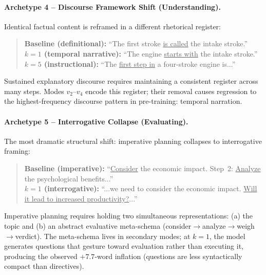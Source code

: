 \documentclass{article}
\begin{document}
\paragraph{Archetype 4 -- Discourse Framework Shift (Understanding).}
Identical factual content is reframed in a different rhetorical register:
\begin{quote}
\small
\textbf{Baseline (definitional):} ``The first stroke \underline{is called} the intake stroke.''\\
\textbf{$k\!=\!1$ (temporal narrative):} ``The engine \underline{starts with} the intake stroke.''\\
\textbf{$k\!=\!5$ (instructional):} ``The \underline{first step in} a four-stroke engine is...''
\end{quote}
Sustained explanatory discourse requires maintaining a consistent register across
many steps.  Modes $v_2$--$v_4$ encode this register; their removal causes
regression to the highest-frequency discourse pattern in pre-training:
temporal narration.

\paragraph{Archetype 5 -- Interrogative Collapse (Evaluating).}
The most dramatic structural shift: imperative planning collapses to interrogative framing:
\begin{quote}
\small
\textbf{Baseline (imperative):} ``\underline{Consider} the economic impact. Step~2: \underline{Analyze} the psychological benefits...''\\
\textbf{$k\!=\!1$ (interrogative):} ``...we need to consider the economic impact. \underline{Will it lead to increased productivity?}...''
\end{quote}
Imperative planning requires holding two simultaneous representations: (a) the topic
and (b) an abstract evaluative meta-schema (consider$\to$analyze$\to$weigh$\to$verdict).
The meta-schema lives in secondary modes; at $k\!=\!1$, the model generates questions
that gesture toward evaluation rather than executing it, producing the observed $+7.7$-word
inflation (questions are less syntactically compact than directives).
\end{document}
